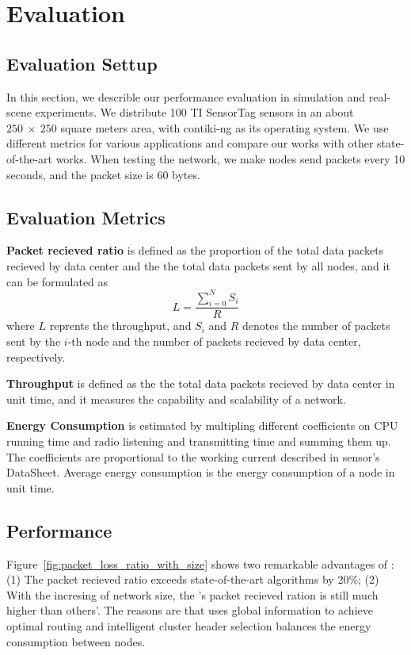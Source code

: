 \section{Evaluation}
\label{Eva}

\subsection{Evaluation Settup}
In this section, we describle our performance evaluation in simulation and
real-scene experiments. We distribute 100 TI SensorTag sensors in an about
$250~\times~250$ square meters area, with contiki-ng as its operating system. We
use different metrics for various applications and compare our works with other
state-of-the-art works. When testing the network, we make nodes send packets
every 10 seconds, and the packet size is 60 bytes.

\subsection{Evaluation Metrics}

\textbf{Packet recieved ratio} is defined as the proportion of the total data
packets recieved by data center and the the total data packets sent by all nodes,
and it can be formulated as
\begin{equation}
	L = \frac{\sum_{i = 0}^{N}S_i}{R}
\end{equation}
where $L$ reprents the throughput, and $S_i$ and $R$ denotes the number of
packets sent by the $i$-th node and the number of packets recieved by data
center, respectively.

\textbf{Throughput} is defined as the the total data packets recieved by data
center in unit time, and it measures the capability and scalability of a network.

\textbf{Energy Consumption} is estimated by multipling different coefficients on
CPU running time and radio listening and transmitting time and summing them up.
The coefficients are proportional to the working current described in sensor's
DataSheet. Average energy consumption is the energy consumption of a node in
unit time.

\subsection{Performance}

Figure~\ref{fig:packet_loss_ratio_with_size} shows two remarkable advantages of
{\sdn}: (1) The packet recieved ratio exceeds state-of-the-art
algorithms\cite{winter2012rpl, kaur2016wsn} by 20\%; (2) With the incresing of
network size, the {\sdn}'s packet recieved ration is still much higher than
others'. The reasons are that {\sdn} uses global information to achieve optimal
routing and intelligent cluster header selection balances the energy consumption
between nodes.

